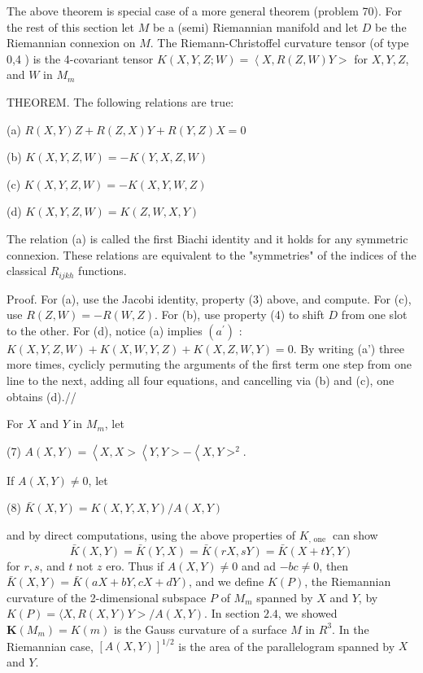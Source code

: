\documentclass[10pt]{article}
\begin{document}
The above theorem is special case of a more general theorem (problem 70). For the rest of this section let $M$ be a (semi) Riemannian manifold and let $D$ be the Riemannian connexion on $M$. The Riemann-Christoffel curvature tensor (of type 0,4 ) is the 4-covariant tensor $K(X, Y, Z ; W)=\left\langle X, R(Z, W) Y>\right.$ for $X, Y, Z$, and $W$ in $M_{m}$

THEOREM. The following relations are true:

(a) $R(X, Y) Z+R(Z, X) Y+R(Y, Z) X=0$

(b) $K(X, Y, Z, W)=-K(Y, X, Z, W)$

(c) $K(X, Y, Z, W)=-K(X, Y, W, Z)$

(d) $K(X, Y, Z, W)=K(Z, W, X, Y)$

The relation (a) is called the first Biachi identity and it holds for any symmetric connexion. These relations are equivalent to the "symmetries" of the indices of the classical $R_{i j k h}$ functions.

Proof. For (a), use the Jacobi identity, property (3) above, and compute. For (c), use $R(Z, W)=-R(W, Z)$. For (b), use property (4) to shift $D$ from one slot to the other. For (d), notice (a) implies $\left(a^{\prime}\right)$ : $K(X, Y, Z, W)+K(X, W, Y, Z)+K(X, Z, W, Y)=0 .$ By writing (a') three more times, cyclicly permuting the arguments of the first term one step from one line to the next, adding all four equations, and cancelling via (b) and (c), one obtains (d).//

For $X$ and $Y$ in $M_{m}$, let

(7) $A(X, Y)=\left\langle X, X>\left\langle Y, Y>-\left\langle X, Y>^{2}\right.\right.\right.$.

If $A(X, Y) \neq 0$, let

(8) $\bar{K}(X, Y)=K(X, Y, X, Y) / A(X, Y)$

and by direct computations, using the above properties of $K_{\text {, one }}$ can show
$$
\bar{K}(X, Y)=\bar{K}(Y, X)=\bar{K}(r X, s Y)=\bar{K}(X+t Y, Y)
$$
for $r, s$, and $t$ not $z$ ero. Thus if $A(X, Y) \neq 0$ and ad $-b c \neq 0$, then $\bar{K}(X, Y)=\bar{K}(a X+b Y, c X+d Y)$, and we define $K(P)$, the Riemannian curvature of the 2-dimensional subspace $P$ of $M_{m}$ spanned by $X$ and $Y$, by $K(P)=\langle X, R(X, Y) Y>/ A(X, Y)$. In section $2.4$, we showed $\boldsymbol{K}\left(M_{m}\right)=K(m)$ is the Gauss curvature of a surface $M$ in $R^{3}$. In the Riemannian case, $[A(X, Y)]^{1 / 2}$ is the area of the parallelogram spanned by $X$ and $Y$.
\end{document}
